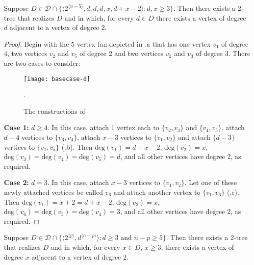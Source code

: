 \documentclass[lotsofwhite,charterfonts]{patmorin}
\newcommand{\rep}[1]{^{\langle#1\rangle}}
\newcommand{\degree}{\mathrm{deg}}
\begin{document}
\begin{lem}
Suppose $D\in \mathcal{D}\cap \{\langle 2\rep{n-5},d,d,d,x,d+x-2 \rangle:
\mbox{$d,x\ge 3$}\}$.
Then there exists a 2-tree that realizes $D$ and in which, for every
$d\in D$ there exists a vertex of degree $d$ adjacent to a vertex of
degree 2.
\end{lem}

\begin{proof}
Begin with the 5 vertex fan depicted in .a that has
one vertex $v_1$ of degree 4, two vertices $v_2$ and $v_5$ of degree 2
and two vertices $v_2$ and $v_3$ of degree 3.  
There are two cases to
consider:

\begin{figure}
\begin{center}
\texttt{[image: basecase-d]}
\caption{The constructions of }.
\end{center}
\end{figure}

\noindent\textbf{Case 1:} $d\ge 4$.  In this case, attach 1 vertex
each to $\{v_2,v_3\}$ and $\{v_4,v_5\}$, attach $d-4$ vertices to
$\{v_3,v_4\}$, attach $x-3$ vertices to $\{v_1,v_2\}$ and attach
$\{d-3\}$ vertices to $\{v_1,v_5\}$ (.b).  Then
$\degree(v_1)=d+x-2$, $\degree(v_2)=x$,
$\degree(v_3)=\degree(v_4)=\degree(v_5)=d$, and all other vertices
have degree 2, as required.

\noindent\textbf{Case 2:} $d=3$.  In this case, attach $x-3$ vertices
to $\{v_1,v_2\}$.  Let one of these newly attached vertices be called
$v_6$ and attach another vertex to $\{v_1,v_6\}$
(.c).  Then $\degree(v_1)=x+2=d+x-2$,
$\degree(v_2)=x$, $\degree(v_6)=\degree(v_3)=\degree(v_4)=3$, and
all other vertices have degree 2, as required. 
\end{proof}


\begin{lem}
Suppose $D\in \mathcal{D}\cap \{\langle 2\rep{p},d\rep{n-p}\rangle:
\mbox{$d\ge 3$ and $n-p \ge 5$}\}$.
Then there exists a 2-tree that realizes $D$ and in which, for every
$x\in D$, $x\ge 3$, there exists a vertex
of degree $x$ adjacent to a vertex of degree 2.
\end{lem}
\end{document}
